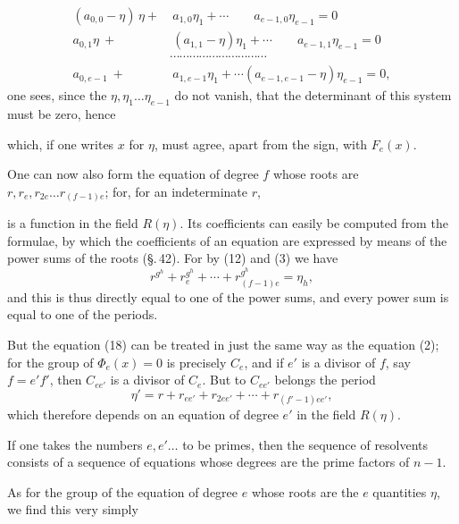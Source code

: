 
\[
\begin{aligned}
(a_{0,0} - \eta)\,\eta + &\ a_{1,0}\eta_1 + \cdots \hspace{2em} a_{e-1,0}\eta_{e-1} = 0 \\
a_{0,1}\eta \ + &\ (a_{1,1} - \eta)\eta_1 + \cdots \hspace{2em} a_{e-1,1}\eta_{e-1} = 0 \\
&\cdots\cdots\cdots\cdots\cdots\cdots\cdots\cdots\cdots\cdots \\
a_{0,e-1} \ + &\ a_{1,e-1}\eta_1 + \cdots (a_{e-1,e-1} - \eta)\eta_{e-1} = 0,
\end{aligned}
\]
one sees, since the $\eta, \eta_1 \ldots \eta_{e-1}$ do not vanish, that the determinant of this system must be zero, hence


which, if one writes $x$ for $\eta$, must agree, apart from the sign, with $F_e(x)$.


One can now also form the equation of degree $f$ whose roots are $r, r_e, r_{2e} \ldots r_{(f-1)e}$; for, for an indeterminate $r$,


is a function in the field $R(\eta)$. Its coefficients can easily be computed from the  formulae, by which the coefficients of an equation are expressed by means of the power sums of the roots (\S.\,42). For by (12) and (3) we have
\[
r^{g^h} + r_e^{g^h} + \cdots + r_{(f-1)e}^{g^h} = \eta_h,
\]
and this is thus directly equal to one of the power sums, and every power sum is equal to one of the periods.

But the equation (18) can be treated in just the same way as the equation (2); for the group of $\Phi_e(x) = 0$ is precisely $C_e$, and if $e'$ is a divisor of $f$, say $f = e'f'$, then $C_{ee'}$ is a divisor of $C_e$. But to $C_{ee'}$ belongs the period
\[
\eta' = r + r_{ee'} + r_{2ee'} + \cdots + r_{(f'-1)ee'},
\]
which therefore depends on an equation of degree $e'$ in the field $R(\eta)$.

If one takes the numbers $e, e' \ldots$ to be primes, then the sequence of resolvents consists of a sequence of equations whose degrees are the prime factors of $n - 1$.

As for the group of the equation of degree $e$ whose roots are the $e$ quantities $\eta$, we find this very simply
